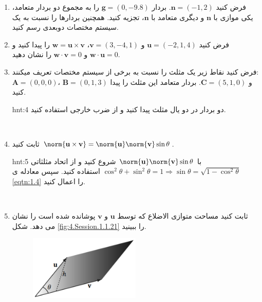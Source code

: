 {\begin{spacing}{1.5}
\begin{enumerate}[label=\textbf{\arabic*}.]
\begin{hint}{hnt:3}
            \end{hint}
            \\
            \item {فرض کنید $\textbf{n}=(-1,2)$. بردار $\textbf{g}=(0,-9.8)$ را به مجموع دو بردار متعامد، یکی موازی با $\textbf{n}$ و دیگری متعامد با $\textbf{n}$، تجزیه کنید. همچنین بردارها را نسبت به یک سیستم مختصات دوبعدی رسم کنید.}
            \\
            \item {فرض کنید $\textbf{u}=(-2,1,4)$ و $\textbf{v}=(3,-4,1)$، $\textbf{w}=\textbf{u}\times\textbf{v}$ را پیدا کنید و $\textbf{w}\cdot\textbf{u}=0$ و $\textbf{w}\cdot\textbf{v}=0$ را نشان دهید.}
            \\
            \item {فرض کنید نقاط زیر یک مثلث را نسبت به برخی از سیستم مختصات تعریف میکنند:\\
                $\textbf{A}=(0,0,0)$، $\textbf{B}=(0,1,3)$ و $\textbf{C}=(5,1,0)$. بردار متعامد این مثلث را پیدا کنید.}
            \begin{hint}{hnt:4}
                \Large
                دو بردار در دو یال مثلث پیدا کنید و از ضرب خارجی استفاده کنید.
            \end{hint}
            \\
            \item \label{question14} {ثابت کنید $\norm{\textbf{u}\times\textbf{v}}=\norm{\textbf{u}}\norm{\textbf{v}}\sin\theta$.}
            \begin{hint}{hnt:5}
                \Large
                با $\norm{\textbf{u}}\norm{\textbf{v}}\sin\theta$ شروع کنید و از اتحاد مثلثاتی $\cos^2\theta+\sin^2\theta=1\Longrightarrow\sin\theta=\sqrt{\displaystyle 1-\cos^2\theta}$ استفاده کنید. سپس معادله ی \ref{eqtn:1.4} را اعمال کنید.
            \end{hint}
            \\
            \item {ثابت کنید  مساحت متوازی الاضلاع که توسط $\textbf{u}$ و $\textbf{v}$ پوشانده شده است را نشان می دهد. شکل \ref{fig:4.Session.1.1.21} را ببینید.}
            \begin{figure}[H]
                \centering
                \setlength{\belowcaptionskip}{-10pt}
                \includegraphics[width=0.5\textwidth]{Images/4/1/4.Session.1.1.21}

\end{figure}
\end{enumerate}
\end{spacing}}
